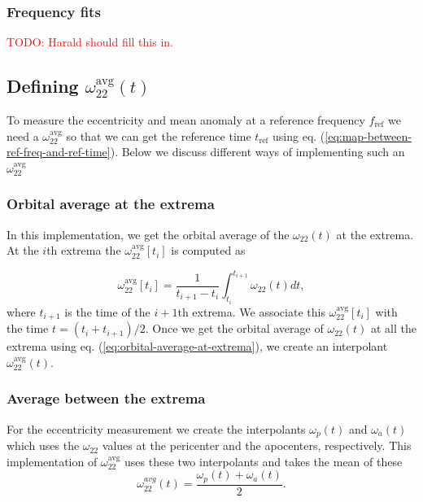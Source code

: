 \documentclass[aps,prd,amsmath,floats,floatfix, twocolumn,
superscriptaddress,nofootinbib,showpacs]{revtex4-1}
\newcommand{\red}{\textcolor{red}}
\newcommand{\TODO}[1]{\red{TODO: #1}}
\begin{document}
\subsubsection{Frequency fits}
\label{sec:frequenc-fits}

\TODO{Harald should fill this in.}

\subsection{Defining $\omega^{\text{avg}}_{22}(t)$}
\label{sec:definig-average-omega22}

To measure the eccentricity and mean anomaly at a reference frequency $f_{\text{ref}}$
we need a $\omega_{22}^{\text{avg}}$ so that we can get the reference
time $t_{\text{ref}}$ using
eq. (\ref{eq:map-between-ref-freq-and-ref-time}). Below we discuss
different ways of implementing such an $\omega_{22}^{\text{avg}}$

\subsubsection{Orbital average at the extrema}
\label{sec:orbital-average-at-the-extrema}
In this implementation, we get the orbital average of the
$\omega_{22}(t)$ at the extrema. At the $i$th extrema the
$\omega^{\text{avg}}_{22}[t_i]$ is computed as

\begin{equation}
  \label{eq:orbital-average-at-extrema}
  \omega^{\text{avg}}_{22}[t_i] = \frac{1}{t_{i+1} -
    t_{i}}\int_{t_{i}}^{t_{i+1}}\omega_{22}(t) dt,
\end{equation}
where $t_{i+1}$ is the time of the $i+1$th extrema. We associate this
$\omega_{22}^{\text{avg}}[t_{i}]$ with the time $t = (t_i +
t_{i+1})/2$. Once we get the orbital average of $\omega_{22}(t)$ at
all the extrema using eq. (\ref{eq:orbital-average-at-extrema}), we
create an interpolant $\omega_{22}^{\text{avg}}(t)$.

\subsubsection{Average between the extrema}
\label{sec:average-between-the-extrema}
For the eccentricity measurement we create the interpolants
$\omega_{p}(t)$ and $\omega_a(t)$ which uses the $\omega_{22}$ values
at the pericenter and the apocenters, respectively. This
implementation of $\omega_{22}^{\text{avg}}$ uses these two
interpolants and takes the mean of these
\begin{equation}
  \label{eq:average-between-extrema}
  \omega_{22}^{avg}(t) = \frac{\omega_{p}(t) + \omega_{a}(t)}{2}.
\end{equation}
\end{document}
